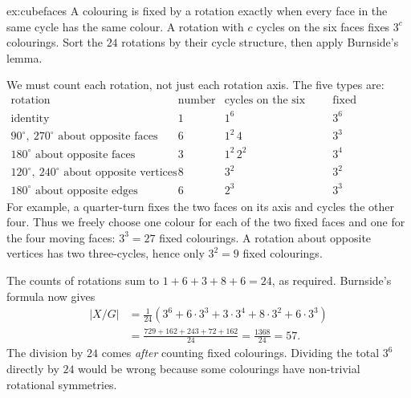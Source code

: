 \begin{solution}{ex:cubefaces}
\idea A colouring is fixed by a rotation exactly when every face in the same cycle has the same colour. A rotation with $c$ cycles on the six faces fixes $3^c$ colourings. Sort the $24$ rotations by their cycle structure, then apply Burnside's lemma.

\writeup We must count each rotation, not just each rotation axis. The five types are:
\[
\begin{array}{l|r|l|r}
\text{rotation}&\text{number}&\text{cycles on the six faces}&\text{fixed colourings}\\\hline
\text{identity}&1&1^6&3^6\\
90^\circ,\ 270^\circ\text{ about opposite faces}&6&1^2\,4&3^3\\
180^\circ\text{ about opposite faces}&3&1^2\,2^2&3^4\\
120^\circ,\ 240^\circ\text{ about opposite vertices}&8&3^2&3^2\\
180^\circ\text{ about opposite edges}&6&2^3&3^3
\end{array}
\]
For example, a quarter-turn fixes the two faces on its axis and cycles the other four. Thus we freely choose one colour for each of the two fixed faces and one for the four moving faces: $3^3=27$ fixed colourings. A rotation about opposite vertices has two three-cycles, hence only $3^2=9$ fixed colourings.

The counts of rotations sum to $1+6+3+8+6=24$, as required. Burnside's formula now gives
\[
\begin{aligned}
|X/G|
&=\frac{1}{24}\left(3^6+6\cdot3^3+3\cdot3^4+8\cdot3^2+6\cdot3^3\right)\\
&=\frac{729+162+243+72+162}{24}
=\frac{1368}{24}
=\boxed{57}.
\end{aligned}
\]
The division by $24$ comes \emph{after} counting fixed colourings. Dividing the total $3^6$ directly by $24$ would be wrong because some colourings have non-trivial rotational symmetries.
\end{solution}

